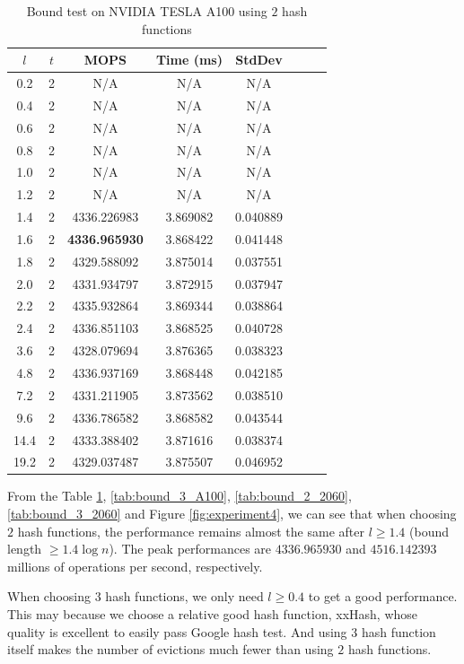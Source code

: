 \documentclass[10pt,twocolumn,letterpaper]{article}
\begin{document}
\begin{table}[!h]
    \centering
   \begin{tabular}{@{}c|ccccccc@{}}
\toprule
$l$ & $t$ & MOPS    & Time (ms)& StdDev  \\ \midrule
0.2 & 2 & N/A & N/A & N/A \\
0.4 & 2 & N/A & N/A & N/A \\
0.6 & 2 & N/A & N/A & N/A \\
0.8 & 2 & N/A & N/A & N/A \\
1.0 & 2 & N/A & N/A & N/A \\
1.2 & 2 & N/A & N/A & N/A \\
1.4 & 2 & 4336.226983 & 3.869082 & 0.040889 \\
1.6 & 2 & \textbf{4336.965930} & 3.868422 & 0.041448 \\
1.8 & 2 & 4329.588092 & 3.875014 & 0.037551 \\
2.0 & 2 & 4331.934797 & 3.872915 & 0.037947 \\
2.2 & 2 & 4335.932864 & 3.869344 & 0.038864 \\
2.4 & 2 & 4336.851103 & 3.868525 & 0.040728 \\
3.6 & 2 & 4328.079694 & 3.876365 & 0.038323 \\
4.8 & 2 & 4336.937169 & 3.868448 & 0.042185 \\
7.2 & 2 & 4331.211905 & 3.873562 & 0.038510 \\
9.6 & 2 & 4336.786582 & 3.868582 & 0.043544 \\
14.4 & 2 & 4333.388402 & 3.871616 & 0.038374 \\
19.2 & 2 & 4329.037487 & 3.875507 & 0.046952 \\
\bottomrule
\end{tabular}
    \caption{Bound test on NVIDIA TESLA A100 using $2$ hash functions}
    \label{tab:bound_2_A100}
\end{table}

From the Table \ref{tab:bound_2_A100}, \ref{tab:bound_3_A100}, \ref{tab:bound_2_2060}, \ref{tab:bound_3_2060} and Figure \ref{fig:experiment4}, we can see that when choosing $2$ hash functions, the performance remains almost the same after $l \geq 1.4$ (bound length $\geq 1.4 \log n$). The peak performances are $4336.965930$ and $4516.142393$ millions of operations per second, respectively.

When choosing $3$ hash functions, we only need $l \geq 0.4$ to get a good performance. This may because we choose a relative good hash function, xxHash, whose quality is excellent to easily pass Google hash test. And using $3$ hash function itself makes the number of evictions much fewer than using $2$ hash functions.
\end{document}
